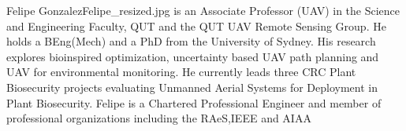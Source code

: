 \documentclass[twocolumn,letterpaper]{IEEEAerospaceCLS}  %
\begin{document}
\begin{biographywithpic}{Felipe Gonzalez}{Felipe_resized.jpg}
    is an Associate Professor (UAV) in the Science and Engineering Faculty, QUT and the QUT UAV Remote Sensing Group.  He holds a BEng(Mech) and a PhD from the University of Sydney.  His research explores bioinspired  optimization,  uncertainty  based UAV path planning and UAV for environmental  monitoring.   He  currently  leads three  CRC  Plant  Biosecurity  projects evaluating  Unmanned  Aerial  Systems  for  Deployment  in Plant Biosecurity.  Felipe is a Chartered Professional Engineer and member of professional organizations including the RAeS,IEEE and AIAA
\end{biographywithpic}
\end{document}
